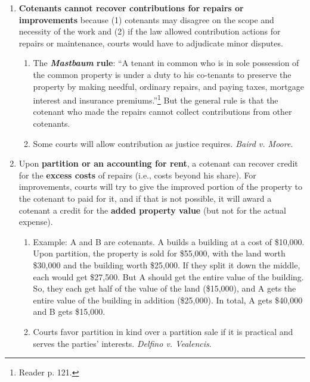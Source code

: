 \begin{enumerate}
    \item \textbf{Cotenants cannot recover contributions for repairs or 
    improvements} because (1) cotenants may disagree on the scope and 
    necessity of the work and (2) if the law allowed contribution actions for 
    repairs or maintenance, courts would have to adjudicate minor disputes.
    \begin{enumerate}
        \item The \textbf{\emph{Mastbaum} rule}: ``A tenant in common who is 
        in sole possession of the common property is under a duty to his 
        co-tenants to preserve the property by making needful, ordinary 
        repairs, and paying taxes, mortgage interest and insurance 
        premiums.''\footnote{Reader p. 121.} But the general rule is that the  
        cotenant who made the repairs cannot collect contributions from other 
        cotenants.
        \item Some courts will allow contribution as justice requires. 
        \emph{Baird v. Moore}.
    \end{enumerate}
    \item Upon \textbf{partition or an accounting for rent}, a cotenant can 
    recover credit for the \textbf{excess costs} of repairs (i.e., costs 
    beyond his share). For improvements, 
    courts will try to give the improved portion of the property to the 
    cotenant to paid for it, and if that is not possible, it will award a 
    cotenant a credit for the \textbf{added property value} (but not for the 
    actual expense).
    \begin{enumerate}
        \item Example: A and B are cotenants. A builds a building at a cost of 
        \$10,000. Upon partition, the property is sold for \$55,000, with the 
        land worth \$30,000 and the building worth \$25,000. If they split it 
        down the middle, each would get \$27,500. But A should get the entire 
        value of the building. So, they each get half of the value of the land 
        (\$15,000), and A gets the entire value of the building in addition 
        (\$25,000). In total, A gets \$40,000 and B gets \$15,000.
        \item Courts favor partition in kind over a partition sale if it is 
        practical and serves the parties' interests. \emph{Delfino v.  
        Vealencis}.
    \end{enumerate}
\end{enumerate}

